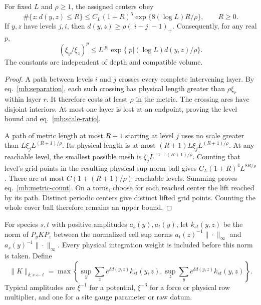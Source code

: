 \documentclass[11pt,letterpaper,reqno]{amsart}
\makeatletter
\numberwithin{equation}{section}
\renewcommand{\eqref}[1]{\textup{eq.~\ref{#1}}}
\theoremstyle{definition}
\newcommand{\ms@minorstart}{%
  \pushQED{\qed}\renewcommand{\qedsymbol}{$\blacksquare$}}
\newenvironment{lemma}[1][]{\ms@minorstart\ms@lemma[#1]}
  {\popQED\endms@lemma}
\theoremstyle{remark}
\makeatother
\begin{document}
\begin{lemma}[Growth and scale ratios]\label{mb:metric-growth}
For fixed $L$ and $\rho\ge1$, the assigned centers obey
\begin{equation}\label{mb:metric-count}
 \#\{z:d(y,z)\le R\}
       \le C_L(1+R)^5\exp\{8(\log L)R/\rho\},\qquad R\ge0.
\end{equation}
If $y,z$ have levels $j,i$, then
$d(y,z)\ge\rho(|i-j|-1)_+$. Consequently, for any real $p$,
\begin{equation}\label{mb:scale-ratio}
 (\xi_y/\xi_z)^p
       \le L^{|p|}\exp\{|p|(\log L)d(y,z)/\rho\}.
\end{equation}
The constants are independent of depth and compatible volume.
\end{lemma}
\begin{proof}
A path between levels $i$ and $j$ crosses every complete
intervening layer. By \eqref{mb:separation}, each such crossing
has physical length greater than $\rho\xi_r$ within layer $r$.
It therefore costs at least $\rho$ in the metric. The crossing
arcs have disjoint interiors. At most one layer is lost at an
endpoint, proving the level bound and \eqref{mb:scale-ratio}.

A path of metric length at most $R+1$ starting at level $j$
uses no scale greater than $L\xi_jL^{(R+1)/\rho}$. Its physical
length is at most $(R+1)L\xi_jL^{(R+1)/\rho}$. At any reachable
level, the smallest possible mesh is
$\xi_jL^{-1-(R+1)/\rho}$. Counting that level's grid points in
the resulting physical sup-norm ball gives
$C_L(1+R)^4L^{8R/\rho}$. There are at most
$C(1+(R+1)/\rho)$ reachable levels. Summing proves
\eqref{mb:metric-count}. On a torus, choose for each reached
center the lift reached by its path. Distinct periodic centers
give distinct lifted grid points. Counting the whole cover ball
therefore remains an upper bound.
\end{proof}

For species $s,t$ with positive amplitudes $a_s(y),a_t(y)$,
let $k_{st}(y,z)$ be the norm of $P_yKP_z$ between the normalized
cell sup norms $a_t(z)^{-1}\|\cdot\|_\infty$ and
$a_s(y)^{-1}\|\cdot\|_\infty$. Every physical integration weight
is included before this norm is taken. Define
\begin{equation}\label{mb:schur-norm}
 \|K\|_{\delta;s\leftarrow t}
 =\max\left\{\sup_y\sum_z e^{\delta d(y,z)}k_{st}(y,z),
              \sup_z\sum_y e^{\delta d(y,z)}k_{st}(y,z)\right\}.
\end{equation}
Typical amplitudes are $\xi^{-1}$ for a potential,
$\xi^{-3}$ for a force or physical row multiplier, and one
for a site gauge parameter or raw datum.
\end{document}
